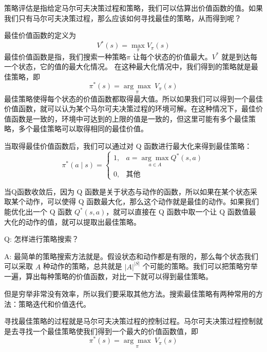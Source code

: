 策略评估是指给定马尔可夫决策过程和策略，我们可以估算出价值函数的值。如果我们只有马尔可夫决策过程，那么应该如何寻找最佳的策略，从而得到呢？

最佳价值函数的定义为
\begin{equation}
  V^{*}(s)=\max _{\pi} V_{\pi}(s)
  \label{eq:}
\end{equation}
最佳价值函数是指，我们搜索一种策略$\pi$ 让每个状态的价值最大。$V^*$ 就是到达每一个状态，它的值的最大化情况。
在这种最大化情况中，我们得到的策略就是最佳策略，即
\begin{equation}
  \pi^{*}(s)=\underset{\pi}{\arg \max }~ V_{\pi}(s)
  \label{eq:}
\end{equation}
最佳策略使得每个状态的价值函数都取得最大值。所以如果我们可以得到一个最佳价值函数，就可以认为某个马尔可夫决策过程的环境可解。在这种情况下，最佳价值函数是一致的，环境中可达到的上限的值是一致的，但这里可能有多个最佳策略，多个最佳策略可以取得相同的最佳价值。

当取得最佳价值函数后，我们可以通过对 Q 函数进行最大化来得到最佳策略：
\begin{equation}
  \pi^{*}(a \mid s)=\left\{\begin{array}{ll}
  1, &  a=\underset{a \in A}{\arg \max} Q^{*}(s, a) \\
  0, & \text {其他 }
  \end{array}\right.
  \label{eq:max_q_function}
\end{equation}

当Q函数收敛后，因为 Q 函数是关于状态与动作的函数，所以如果在某个状态采取某个动作，可以使得 Q 函数最大化，那么这个动作就是最佳的动作。如果我们能优化出一个 Q 函数 $Q^{*}(s, a)$，就可以直接在 Q 函数中取一个让 Q 函数值最大化的动作的值，就可以提取出最佳策略。

Q: 怎样进行策略搜索？

A: 最简单的策略搜索方法就是。假设状态和动作都是有限的，那么每个状态我们可以采取 $A$ 种动作的策略，总共就是 $|A|^{|S|}$ 个可能的策略。我们可以把策略穷举一遍，算出每种策略的价值函数，对比一下就可以得到最佳策略。

但是穷举非常没有效率，所以我们要采取其他方法。搜索最佳策略有两种常用的方法：策略迭代和价值迭代。

寻找最佳策略的过程就是马尔可夫决策过程的控制过程。马尔可夫决策过程控制就是去寻找一个最佳策略使我们得到一个最大的价值函数值，即
\begin{equation}
  \pi^{*}(s)=\underset{\pi}{\arg \max } ~ V_{\pi}(s)
  \label{eq:}
\end{equation}

